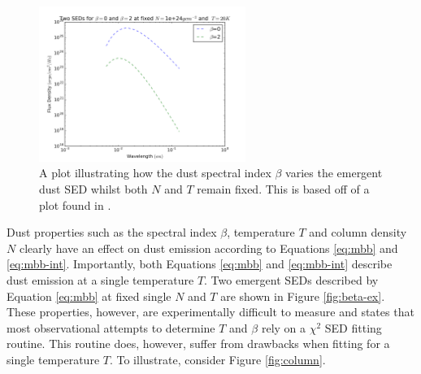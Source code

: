 \documentclass{report}
\begin{document}
\begin{figure}[h]
  \begin{center}
    \includegraphics[width=0.6\textwidth]{../img/flux_density_combined.png}
    \caption[A plot illustrating how the dust spectral index $\beta$ varies the emergent dust SED whilst both $N$ and $T$ remain fixed. This is based off of a plot found in \textcite{noise}.]{A plot illustrating how the dust spectral index $\beta$ varies the emergent dust SED whilst both $N$ and $T$ remain fixed. This is based off of a plot found in \textcite{noise}.}
  \end{center}
\end{figure} \label{fig:beta-ex}

Dust properties such as the spectral index $\beta$, temperature $T$ and column density $N$ clearly have an effect on dust emission according to Equations \ref{eq:mbb} and \ref{eq:mbb-int}. Importantly, both Equations \ref{eq:mbb} and \ref{eq:mbb-int} describe dust emission at a single temperature $T$. Two emergent SEDs described by Equation \ref{eq:mbb} at fixed single $N$ and $T$ are shown in Figure \ref{fig:beta-ex}. These properties, however, are experimentally difficult to measure and \textcite{kelly} states that most observational attempts to determine $T$ and $\beta$ rely on a $\chi^{2}$ SED fitting routine. This routine does, however, suffer from drawbacks when fitting for a single temperature $T$. To illustrate, consider Figure \ref{fig:column}.
\end{document}

